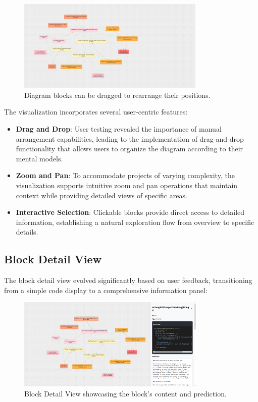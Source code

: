 \begin{figure}[H]
    \centering
    \includegraphics[width=0.8\textwidth]{images/diagram-dragged.png}
    \caption{Diagram blocks can be dragged to rearrange their positions.}
    \label{fig:diagram-dragged}
\end{figure}

The visualization incorporates several user-centric features:

\begin{itemize}
    \item \textbf{Drag and Drop}: User testing revealed the importance of manual arrangement capabilities, leading to the implementation of drag-and-drop functionality that allows users to organize the diagram according to their mental models.
    
    \item \textbf{Zoom and Pan}: To accommodate projects of varying complexity, the visualization supports intuitive zoom and pan operations that maintain context while providing detailed views of specific areas.
    
    \item \textbf{Interactive Selection}: Clickable blocks provide direct access to detailed information, establishing a natural exploration flow from overview to specific details.
\end{itemize}

\subsection{Block Detail View}

The block detail view evolved significantly based on user feedback, transitioning from a simple code display to a comprehensive information panel:

\begin{figure}[H]
    \centering
    \includegraphics[width=0.8\textwidth]{images/block_detail.png}
    \caption{Block Detail View showcasing the block's content and prediction.}
    \label{fig:block-detail}
\end{figure}

